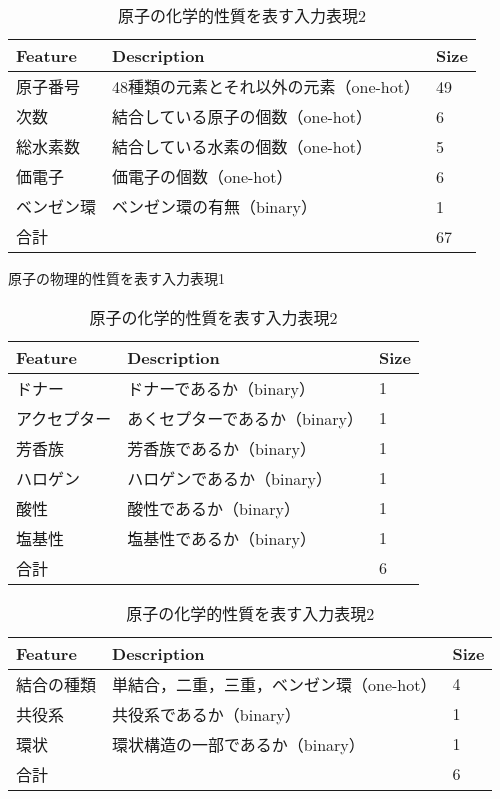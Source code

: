 \documentclass[twocolumn]{jarticle}
\begin{document}
\begin{table}[htb]
  \footnotesize
  \begin{tabular}{lll} \hline
  	Feature & Description & Size \\  \hline \hline 
	原子番号& 48種類の元素とそれ以外の元素（one-hot）& 49 \\ 
	次数    & 結合している原子の個数（one-hot） & 6 \\ 
	総水素数& 結合している水素の個数（one-hot） & 5 \\ 
	価電子  & 価電子の個数（one-hot） & 6 \\ 
	ベンゼン環 & ベンゼン環の有無（binary） & 1  \\\hline
	合計 & & 67 \\ \hline
  \end{tabular}
  \vspace{-2ex}
  \caption{原子の物理的性質を表す入力表現1}
  \vspace{1em}
  \label{tab:ecfp}\par
  \begin{tabular}{lll} \hline
  	Feature & Description & Size \\  \hline \hline 
	ドナー & ドナーであるか（binary） & 1 \\ 
	アクセプター & あくセプターであるか（binary） & 1 \\ 
	芳香族 & 芳香族であるか（binary） & 1 \\ 
	ハロゲン & ハロゲンであるか（binary） & 1 \\ 
	酸性 & 酸性であるか（binary） & 1 \\ 
	塩基性 & 塩基性であるか（binary） & 1 \\ \hline
	合計 & & 6 \\ \hline
  \end{tabular}
    \vspace{-2ex}
  \caption{原子の化学的性質を表す入力表現2}
    \vspace{1em}
  \label{tab:fcfp}
  \begin{tabular}{lll} \hline
  	Feature & Description & Size \\  \hline \hline 
	 結合の種類 & 単結合，二重，三重，ベンゼン環（one-hot） & 4 \\ 
	 共役系 & 共役系であるか（binary） & 1 \\ 
	 環状 &  環状構造の一部であるか（binary） & 1 \\ \hline
	合計 & & 6 \\ \hline
  \end{tabular}
      \vspace{-2ex}

\end{table}
\end{document}
